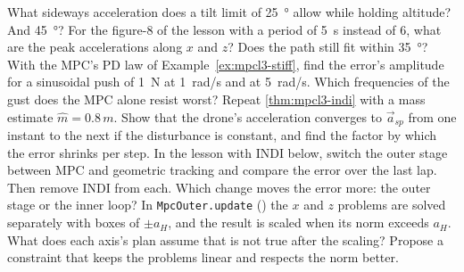 \begin{exercises}
\exercise[1] What sideways acceleration does a tilt limit of \SI{25}{\degree} allow while holding altitude? And \SI{45}{\degree}?
\exercise[1] For the figure-8 of the lesson with a period of \SI{5}{s} instead of 6, what are the peak accelerations along $x$ and $z$? Does the path still fit within \SI{35}{\degree}?
\exercise[2] With the MPC's PD law of Example~\ref{ex:mpcl3-stiff}, find the error's amplitude for a sinusoidal push of \SI{1}{N} at \SI{1}{rad/s} and at \SI{5}{rad/s}. Which frequencies of the gust does the MPC alone resist worst?
\exercise[2] Repeat \cref{thm:mpcl3-indi} with a mass estimate $\hat m = 0.8\,m$. Show that the drone's acceleration converges to $\vec a_{sp}$ from one instant to the next if the disturbance is constant, and find the factor by which the error shrinks per step.
\exercise[2] In the lesson with INDI below, switch the outer stage between MPC and geometric tracking and compare the error over the last lap. Then remove INDI from each. Which change moves the error more: the outer stage or the inner loop?
\exercise[2] In \texttt{MpcOuter.update} () the $x$ and $z$ problems are solved separately with boxes of $\pm a_H$, and the result is scaled when its norm exceeds $a_H$. What does each axis's plan assume that is not true after the scaling? Propose a constraint that keeps the problems linear and respects the norm better.

\end{exercises}
